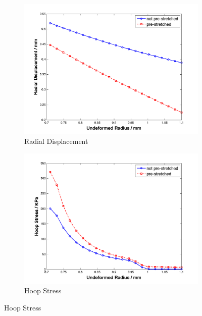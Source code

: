 \begin{figure}[H]
	\begin{subfigure}[b]{0.5\textwidth}
		\centering
		\includegraphics[width=\textwidth]{./figures/artery_ur.png}
		\caption{Radial Displacement}
		\label{ur_artery}
	\end{subfigure}
	\begin{subfigure}[b]{0.5\textwidth}
		\centering
		\includegraphics[width=\textwidth]{./figures/artery_hoop.png}
		\caption{Hoop Stress}
		\label{hoop_artery}
	\end{subfigure}
	

\end{figure}
